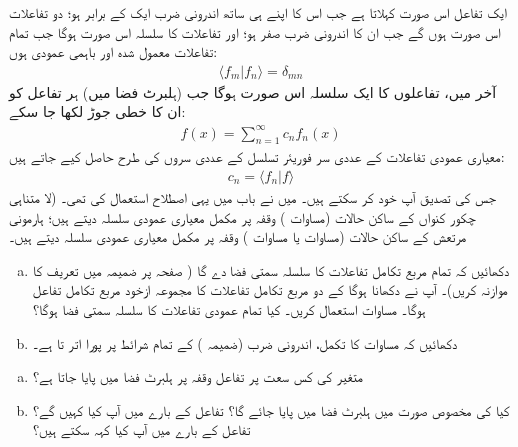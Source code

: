 ایک تفاعل اس صورت کہلاتا ہے جب اس کا اپنے ہی ساتھ اندرونی ضرب ایک  کے برابر ہو؛ دو تفاعلات اس صورت  ہوں گے جب ان کا اندرونی ضرب صفر   ہو؛  اور تفاعلات  کا سلسلہ اس صورت  ہوگا جب تمام تفاعلات  معمول شدہ اور باہمی  عمودی ہوں:
\begin{align}
	\langle f_m | f_n \rangle = \delta_{mn}
\end{align}
آخر میں،  تفاعلوں کا ایک سلسلہ اس صورت ہوگا جب (ہلبرٹ فضا میں)  ہر تفاعل کو ان کا خطی جوڑ لکھا جا سکے:
\begin{align}
	f(x) = \sum\limits_{n=1}^\infty c_{n} f_{n}(x)
\end{align}
معیاری عمودی تفاعلات       کے عددی سر فوریئر تسلسل کے عددی سروں کی طرح حاصل کیے جاتے ہیں:
\begin{align}
	c_{n} = \langle f_{n} | f \rangle
\end{align}
جس کی   تصدیق آپ خود کر سکتے ہیں۔ میں نے باب  میں یہی اصطلاح استعمال کی تھی۔ (لا متناہی چکور کنواں کے ساکن حالات  (مساوات )  وقفہ  پر مکمل معیاری عمودی سلسلہ دیتے ہیں؛  ہارمونی مرتعش کے ساکن حالات (مساوات  یا  مساوات ) وقفہ  پر مکمل معیاری عمودی سلسلہ دیتے ہیں۔

\begin{enumerate}[a.]
\item
 دکھائیں کہ تمام   مربع تکامل  تفاعلات  کا سلسلہ سمتی  فضا دے گا ( صفحہ  پر ضمیمہ  میں تعریف کا موازنہ کریں)۔   آپ نے دکھانا  ہوگا کے دو  مربع تکامل  تفاعلات کا مجموعہ ازخود مربع تکامل  تفاعل  ہوگا۔  مساوات  استعمال کریں۔ کیا تمام عمودی تفاعلات  کا سلسلہ سمتی فضا ہوگا؟
 \item
 دکھائیں  کہ مساوات  کا تکمل،  اندرونی  ضرب (ضمیمہ ) کے تمام شرائط پر پورا اتر تا ہے۔
 \end{enumerate}
\begin{enumerate}[a.]
\item
 متغیر    کی کس سعت پر تفاعل   وقفہ   پر ہلبرٹ فضا میں پایا جاتا ہے؟
\item
 کیا  کی مخصوص صورت میں  ہلبرٹ فضا میں پایا جائے گا؟ تفاعل    کے بارے میں آپ کیا کہیں گے؟  تفاعل  کے بارے میں آپ کیا کہہ سکتے ہیں؟
 \end{enumerate}


